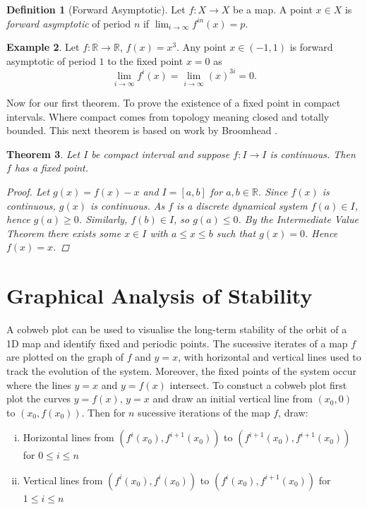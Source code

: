 \documentclass[11pt,a4paper,oneside]{memoir}
\theoremstyle{plain}
\newtheorem{thm}{Theorem}[chapter]
\theoremstyle{definition}
\newtheorem{defn}[thm]{Definition}
\newtheorem{exmp}[thm]{Example}
\begin{document}
\begin{defn}[Forward Asymptotic]
    Let $f: X \to X$ be a map. A point $x \in X$ is \emph{forward asymptotic} of period $n$ if $\lim_{i \to \infty} f^{in}(x) = p$.
\end{defn}

\begin{exmp}
    Let $f: \mathbb{R} \to \mathbb{R}$, $f(x) = x^3$. Any point $x \in (-1, 1)$ is forward asymptotic of period $1$ to the fixed point $x = 0$ as \[\lim_{i \to \infty} f^{i} \left(x\right)  = \lim_{i \to \infty} \left(x\right) ^{3i} = 0.\]
\end{exmp}

Now for our first theorem. To prove the existence of a fixed point in compact intervals. Where compact comes from topology meaning closed and totally bounded. This next theorem is based on work by Broomhead \cite{broomhead}.
\begin{thm}
    Let $I$ be compact interval and suppose $f: I \to I$ is continuous. Then $f$ has a fixed point.
    \begin{proof}
        Let $g(x) = f(x) - x$ and $I = [a, b]$ for $a, b \in \mathbb{R}$. Since $f(x)$ is continuous, $g(x)$ is continuous. As $f$ is a discrete dynamical system $f(a) \in I$, hence $g(a) \geq 0$. Similarly, $f(b) \in I$, so $g(a) \leq 0$. By the Intermediate Value Theorem there exists some $x \in I$ with $a \leq x \leq b$ such that $g(x) = 0$. Hence $f(x) = x$.
    \end{proof}
\end{thm}

\section{Graphical Analysis of Stability}
A cobweb plot can be used to visualise the long-term stability of the orbit of a 1D map and identify fixed and periodic points. The sucessive iterates of a map $f$ are plotted on the graph of $f$ and $y = x$, with horizontal and vertical lines used to track the evolution of the system. Moreover, the fixed points of the system occur where the lines $y = x$ and $y = f(x)$ intersect. To constuct a cobweb plot first plot the curves $y = f(x)$, $y = x$ and draw an initial vertical line from $(x_0, 0)$ to $(x_0, f(x_0))$. Then for $n$ sucessive iterations of the map $f$, draw:
\begin{enumerate}[i.]
    \item Horizontal lines from $(f^i(x_0), f^{i+1}(x_0))$ to $(f^{i+1}(x_0), f^{i+1}(x_0))$ for $0 \leq i \leq n$
    \item Vertical lines from $(f^i(x_0), f^i(x_0))$ to $(f^i(x_0), f^{i+1}(x_0))$ for $1 \leq i \leq n$
\end{enumerate}
\end{document}
